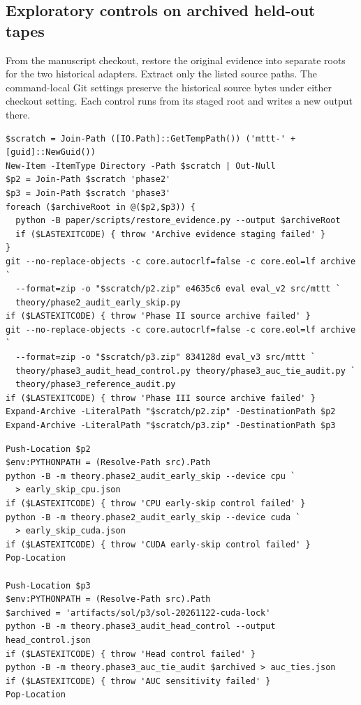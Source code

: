 \subsection{Exploratory controls on archived held-out tapes}
\label{app:archived-controls}
From the manuscript checkout, restore the original evidence into separate roots for the two historical adapters. Extract only the listed source paths. The command-local Git settings preserve the historical source bytes under either checkout setting. Each control runs from its staged root and writes a new output there.
\begin{commandblock}
\begin{verbatim}
$scratch = Join-Path ([IO.Path]::GetTempPath()) ('mttt-' + [guid]::NewGuid())
New-Item -ItemType Directory -Path $scratch | Out-Null
$p2 = Join-Path $scratch 'phase2'
$p3 = Join-Path $scratch 'phase3'
foreach ($archiveRoot in @($p2,$p3)) {
  python -B paper/scripts/restore_evidence.py --output $archiveRoot
  if ($LASTEXITCODE) { throw 'Archive evidence staging failed' }
}
git --no-replace-objects -c core.autocrlf=false -c core.eol=lf archive `
  --format=zip -o "$scratch/p2.zip" e4635c6 eval eval_v2 src/mttt `
  theory/phase2_audit_early_skip.py
if ($LASTEXITCODE) { throw 'Phase II source archive failed' }
git --no-replace-objects -c core.autocrlf=false -c core.eol=lf archive `
  --format=zip -o "$scratch/p3.zip" 834128d eval_v3 src/mttt `
  theory/phase3_audit_head_control.py theory/phase3_auc_tie_audit.py `
  theory/phase3_reference_audit.py
if ($LASTEXITCODE) { throw 'Phase III source archive failed' }
Expand-Archive -LiteralPath "$scratch/p2.zip" -DestinationPath $p2
Expand-Archive -LiteralPath "$scratch/p3.zip" -DestinationPath $p3
\end{verbatim}
\end{commandblock}
\begin{commandblock}
\begin{verbatim}
Push-Location $p2
$env:PYTHONPATH = (Resolve-Path src).Path
python -B -m theory.phase2_audit_early_skip --device cpu `
  > early_skip_cpu.json
if ($LASTEXITCODE) { throw 'CPU early-skip control failed' }
python -B -m theory.phase2_audit_early_skip --device cuda `
  > early_skip_cuda.json
if ($LASTEXITCODE) { throw 'CUDA early-skip control failed' }
Pop-Location

Push-Location $p3
$env:PYTHONPATH = (Resolve-Path src).Path
$archived = 'artifacts/sol/p3/sol-20261122-cuda-lock'
python -B -m theory.phase3_audit_head_control --output head_control.json
if ($LASTEXITCODE) { throw 'Head control failed' }
python -B -m theory.phase3_auc_tie_audit $archived > auc_ties.json
if ($LASTEXITCODE) { throw 'AUC sensitivity failed' }
Pop-Location
\end{verbatim}
\end{commandblock}

